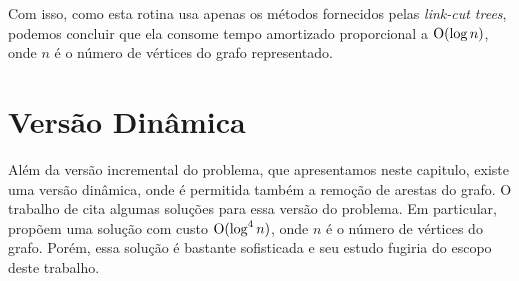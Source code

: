 Com isso, como esta rotina usa apenas os métodos fornecidos pelas \emph{link-cut trees}, podemos concluir que ela consome tempo amortizado proporcional a $\mathrm{O}(\log n)$, onde $n$ é o número de vértices do grafo representado.

\section{Versão Dinâmica}
\label{sec:versao-dinamica}

Além da versão incremental do problema, que apresentamos neste capitulo, existe uma versão dinâmica, onde é permitida também a remoção de arestas do grafo. O trabalho de \citet{hanauer2021recent} cita algumas soluções para essa versão do problema. Em particular, \citet{10.1145/502090.502095} propõem uma solução com custo $\mathrm{O}(\log^4 n)$, onde $n$ é o número de vértices do grafo. Porém, essa solução é bastante sofisticada e seu estudo fugiria do escopo deste trabalho.